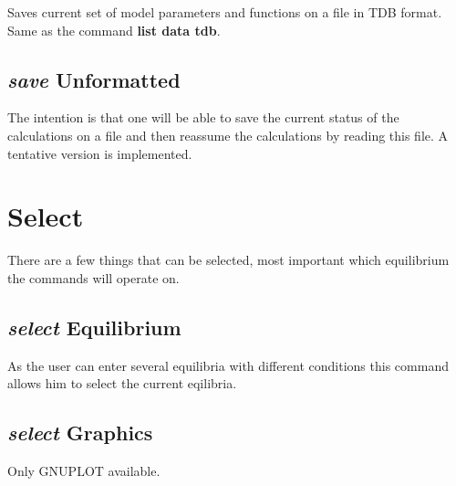 \documentclass[12pt]{article}
\begin{document}
Saves current set of model parameters and functions on a file in TDB
format.  Same as the command {\bf list data tdb}.

\subsection{{\em save} Unformatted}

The intention is that one will be able to save the current status of
the calculations on a file and then reassume the calculations by
reading this file.  A tentative version is implemented.

\section{Select }

There are a few things that can be selected, most important which
equilibrium the commands will operate on.

\subsection{{\em select} Equilibrium}

As the user can enter several equilibria with different conditions
this command allows him to select the current eqilibria.

\subsection{{\em select} Graphics}

Only GNUPLOT available.
\end{document}
